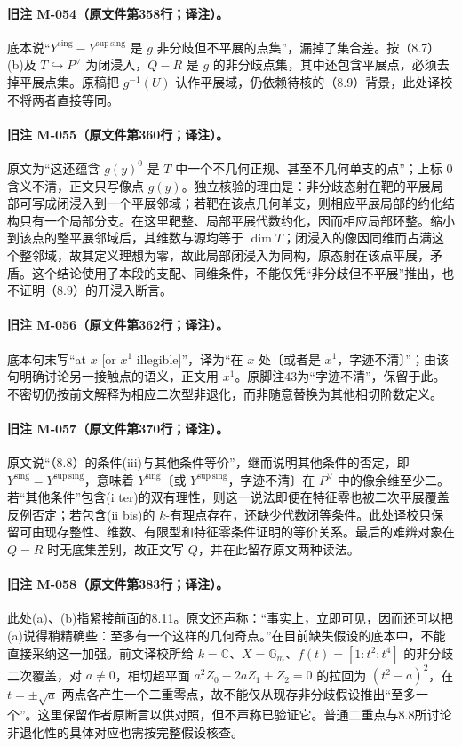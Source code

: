 \documentclass[UTF8,a4paper]{ctexbook}
\begin{document}
\paragraph{旧注 M-054（原文件第358行；译注）。}
底本说“${Y^{\mathrm{sing}}}-{Y^{\mathrm{sup\,sing}}}$ 是 $g$ 非分歧但不平展的点集”，漏掉了集合差。按（8.7）(b)及 $T\hookrightarrow P^\vee$ 为闭浸入，$Q-R$ 是 $g$ 的非分歧点集，其中还包含平展点，必须去掉平展点集。原稿把 $g^{-1}(U)$ 认作平展域，仍依赖待核的（8.9）背景，此处译校不将两者直接等同。

\paragraph{旧注 M-055（原文件第360行；译注）。}
原文为“这还蕴含 $g(y)^0$ 是 $T$ 中一个不几何正规、甚至不几何单支的点”；上标 $0$ 含义不清，正文只写像点 $g(y)$。独立核验的理由是：非分歧态射在靶的平展局部可写成闭浸入到一个平展邻域；若靶在该点几何单支，则相应平展局部的约化结构只有一个局部分支。在这里靶整、局部平展代数约化，因而相应局部环整。缩小到该点的整平展邻域后，其维数与源均等于 $\dim T$；闭浸入的像因同维而占满这个整邻域，故其定义理想为零，故此局部闭浸入为同构，原态射在该点平展，矛盾。这个结论使用了本段的支配、同维条件，不能仅凭“非分歧但不平展”推出，也不证明（8.9）的开浸入断言。

\paragraph{旧注 M-056（原文件第362行；译注）。}
底本句末写“at $x$ [or $x^1$ illegible]”，译为“在 $x$ 处〔或者是 $x^1$，字迹不清〕”；由该句明确讨论另一接触点的语义，正文用 $x^1$。原脚注43为“字迹不清”，保留于此。不密切仍按前文解释为相应二次型非退化，而非随意替换为其他相切阶数定义。

\paragraph{旧注 M-057（原文件第370行；译注）。}
原文说“（8.8）的条件(iii)与其他条件等价”，继而说明其他条件的否定，即 ${Y^{\mathrm{sing}}}={Y^{\mathrm{sup\,sing}}}$，意味着 ${Y^{\mathrm{sing}}}$〔或 ${Y^{\mathrm{sup\,sing}}}$，字迹不清〕在 $P^\vee$ 中的像余维至少二。若“其他条件”包含(i ter)的双有理性，则这一说法即便在特征零也被二次平展覆盖反例否定；若包含(ii bis)的 $k$-有理点存在，还缺少代数闭等条件。此处译校只保留可由现存整性、维数、有限型和特征零条件证明的等价关系。最后的难辨对象在 $Q=R$ 时无底集差别，故正文写 $Q$，并在此留存原文两种读法。

\paragraph{旧注 M-058（原文件第383行；译注）。}
此处(a)、(b)指紧接前面的8.11。原文还声称：“事实上，立即可见，因而还可以把(a)说得稍精确些：至多有一个这样的几何奇点。”在目前缺失假设的底本中，不能直接采纳这一加强。前文译校所给 $k=\mathbb C$、$X=\mathbb G_m$、$f(t)=[1:t^2:t^4]$ 的非分歧二次覆盖，对 $a\ne0$，相切超平面 $a^2Z_0-2aZ_1+Z_2=0$ 的拉回为 $(t^2-a)^2$，在 $t=\pm\sqrt a$ 两点各产生一个二重零点，故不能仅从现存非分歧假设推出“至多一个”。这里保留作者原断言以供对照，但不声称已验证它。普通二重点与8.8所讨论非退化性的具体对应也需按完整假设核查。
\end{document}
